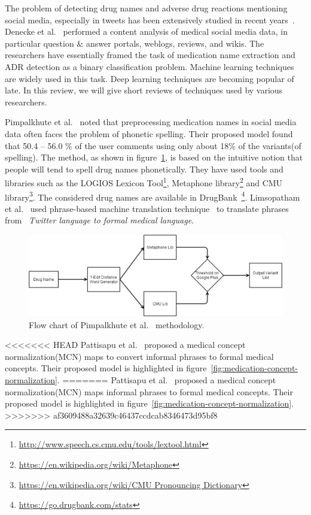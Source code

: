 The problem of detecting drug names and adverse drug reactions mentioning social media, especially in tweets has been extensively studied in recent years~\cite{weissenbacher2018overview}. Denecke et al.~\cite{DENECKE20091870} performed a content analysis of medical social media data, in particular question \& answer portals, weblogs, reviews, and wikis. The researchers have essentially framed the task of medication name extraction and ADR detection as a binary classification problem. Machine learning techniques are widely used in this task. Deep learning techniques are becoming popular of late. In this review, we will give short reviews of techniques used by various researchers.

Pimpalkhute et al.~\cite{pimpalkhute2014phonetic} noted that preprocessing medication names in social media data often faces the problem of phonetic spelling. Their proposed model found that 50.4 – 56.0 \% of the user comments using only about 18\% of the variants(of spelling). The method, as shown in figure~\ref{fig:model-pimpalkhute}, is based on the intuitive notion that people will tend to spell drug names phonetically. They have used tools and libraries such as the LOGIOS Lexicon Tool\footnote{\url{http://www.speech.cs.cmu.edu/tools/lextool.html}}, Metaphone library\footnote{\url{https://en.wikipedia.org/wiki/Metaphone}} and CMU library\footnote{\url{https://en.wikipedia.org/wiki/CMU Pronouncing Dictionary}}. The considered drug names are available in DrugBank~\footnote{\url{https://go.drugbank.com/stats}}. Limsopatham et al.~\cite{limsopatham2015adapting} used phrase-based machine translation technique~\cite{koehn2003statistical} to translate phrases from ~\textit{Twitter language to formal medical language}.

\begin{figure}[h]
	\centering
	\includegraphics[width=0.99\linewidth]{Figures/m.png}
	\caption{Flow chart of Pimpalkhute et al.~\cite{pimpalkhute2014phonetic} methodology.}
	\label{fig:model-pimpalkhute}
\end{figure}

<<<<<<< HEAD
Pattisapu et al.~\cite{PATTISAPU2020103522} proposed a medical concept normalization(MCN) maps to convert informal phrases to formal medical concepts. Their proposed model is highlighted in figure~\ref{fig:medication-concept-normalization}.
=======
Pattisapu et al.~\cite{PATTISAPU2020103522} proposed a medical concept normalization(MCN) maps informal phrases to formal medical concepts. Their proposed model is highlighted in figure~\ref{fig:medication-concept-normalization}.
>>>>>>> af3609488a32639c46437ccdcab8346473d95bf8

